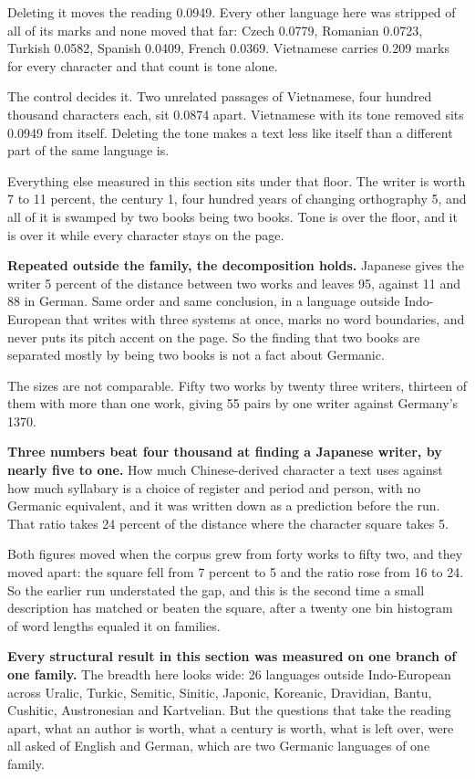 Deleting it moves the reading 0.0949. Every other language here was stripped of all of its marks and none moved that far: Czech 0.0779, Romanian 0.0723, Turkish 0.0582, Spanish 0.0409, French 0.0369. Vietnamese carries 0.209 marks for every character and that count is tone alone.

The control decides it. Two unrelated passages of Vietnamese, four hundred thousand characters each, sit 0.0874 apart. Vietnamese with its tone removed sits 0.0949 from itself. Deleting the tone makes a text less like itself than a different part of the same language is.

Everything else measured in this section sits under that floor. The writer is worth 7 to 11 percent, the century 1, four hundred years of changing orthography 5, and all of it is swamped by two books being two books. Tone is over the floor, and it is over it while every character stays on the page.

\textbf{Repeated outside the family, the decomposition holds.} Japanese gives the writer 5 percent of the distance between two works and leaves 95, against 11 and 88 in German. Same order and same conclusion, in a language outside Indo-European that writes with three systems at once, marks no word boundaries, and never puts its pitch accent on the page. So the finding that two books are separated mostly by being two books is not a fact about Germanic.

The sizes are not comparable. Fifty two works by twenty three writers, thirteen of them with more than one work, giving 55 pairs by one writer against Germany's 1370.

\textbf{Three numbers beat four thousand at finding a Japanese writer, by nearly five to one.} How much Chinese-derived character a text uses against how much syllabary is a choice of register and period and person, with no Germanic equivalent, and it was written down as a prediction before the run. That ratio takes 24 percent of the distance where the character square takes 5.

Both figures moved when the corpus grew from forty works to fifty two, and they moved apart: the square fell from 7 percent to 5 and the ratio rose from 16 to 24. So the earlier run understated the gap, and this is the second time a small description has matched or beaten the square, after a twenty one bin histogram of word lengths equaled it on families.

\textbf{Every structural result in this section was measured on one branch of one family.} The breadth here looks wide: 26 languages outside Indo-European across Uralic, Turkic, Semitic, Sinitic, Japonic, Koreanic, Dravidian, Bantu, Cushitic, Austronesian and Kartvelian. But the questions that take the reading apart, what an author is worth, what a century is worth, what is left over, were all asked of English and German, which are two Germanic languages of one family.


